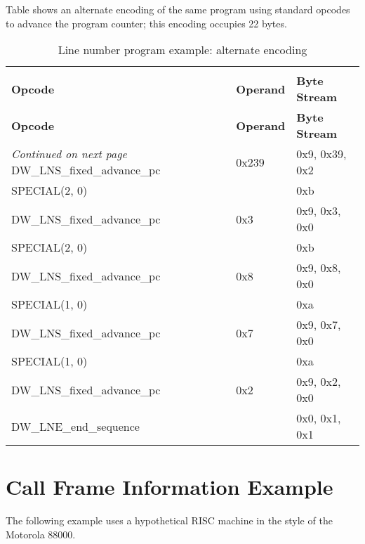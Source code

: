 Table 
shows an alternate 
encoding of the same program using 
standard opcodes to advance
the program counter; 
this encoding occupies 22 bytes.

\begin{centering}
\setlength{\extrarowheight}{0.1cm}
\begin{longtable}{lll}
  \caption{Line number program example: alternate encoding} \label{tab:linenumberprogramexamplealternateencoding} \\
  \hline \\ \bfseries Opcode &\bfseries Operand &\bfseries Byte Stream \\ \hline
\endfirsthead
  \bfseries Opcode &\bfseries Operand &\bfseries Byte Stream\\ \hline
\endhead
  \hline \emph{Continued on next page}
\endfoot
  \hline
\endlastfoot
DW\_LNS\_fixed\_advance\_pc&0x239&0x9, 0x39, 0x2        \\
SPECIAL(2, 0)&& 0xb        \\
DW\_LNS\_fixed\_advance\_pc&0x3&0x9, 0x3, 0x0        \\
SPECIAL(2, 0)&&0xb        \\
DW\_LNS\_fixed\_advance\_pc&0x8&0x9, 0x8, 0x0        \\
SPECIAL(1, 0)&& 0xa        \\
DW\_LNS\_fixed\_advance\_pc&0x7&0x9, 0x7, 0x0        \\
SPECIAL(1, 0) && 0xa        \\
DW\_LNS\_fixed\_advance\_pc&0x2&0x9, 0x2, 0x0        \\
DW\_LNE\_end\_sequence&&0x0, 0x1, 0x1        \\
\end{longtable}
\end{centering}


\section{Call Frame Information Example}
\label{app:callframeinformationexample}

The following example uses a hypothetical RISC machine in
the style of the Motorola 88000.

